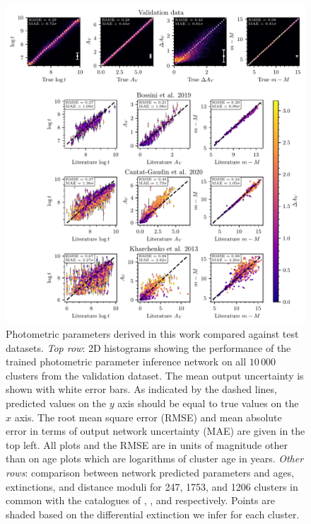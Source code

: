 \begin{figure}[p]
   \centering
   \includegraphics[width=\textwidth]{fig/c3/fig_agenn_comparison.pdf}
   \caption[Photometric parameters derived in this work compared against test datasets]{Photometric parameters derived in this work compared against test datasets. \emph{Top row}: 2D histograms showing the performance of the trained photometric parameter inference network on all $10\,000$ clusters from the validation dataset. The mean output uncertainty is shown with white error bars. As indicated by the dashed lines, predicted values on the $y$ axis should be equal to true values on the $x$ axis. The root mean square error (RMSE) and mean absolute error in terms of output network uncertainty (MAE) are given in the top left. All plots and the RMSE are in units of magnitude other than on age plots which are logarithms of cluster age in years. \emph{Other rows}: comparison between network predicted parameters and ages, extinctions, and distance moduli for 247, 1753, and 1206 clusters in common with the catalogues of \cite{bossini_age_2019}, \cite{cantat-gaudin_painting_2020}, and \cite{kharchenko_global_2013} respectively. Points are shaded based on the differential extinction we infer for each cluster.}%
   \label{c3:fig:agenn_comparison}
\end{figure}

